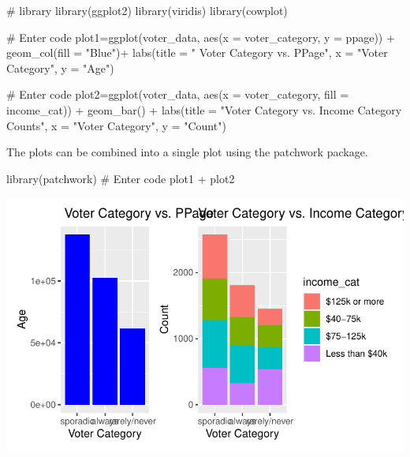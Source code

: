 \documentclass[
  letterpaper,
  DIV=11,
  numbers=noendperiod]{scrartcl}
\newenvironment{Shaded}{\begin{snugshade}}{\end{snugshade}}
\newcommand{\AttributeTok}[1]{\textcolor[rgb]{0.40,0.45,0.13}{#1}}
\newcommand{\CommentTok}[1]{\textcolor[rgb]{0.37,0.37,0.37}{#1}}
\newcommand{\FunctionTok}[1]{\textcolor[rgb]{0.28,0.35,0.67}{#1}}
\newcommand{\NormalTok}[1]{\textcolor[rgb]{0.00,0.23,0.31}{#1}}
\newcommand{\OtherTok}[1]{\textcolor[rgb]{0.00,0.23,0.31}{#1}}
\newcommand{\SpecialCharTok}[1]{\textcolor[rgb]{0.37,0.37,0.37}{#1}}
\newcommand{\StringTok}[1]{\textcolor[rgb]{0.13,0.47,0.30}{#1}}
\begin{document}
\begin{Shaded}
\begin{Highlighting}[]
\CommentTok{\# library}
\FunctionTok{library}\NormalTok{(ggplot2)}
\FunctionTok{library}\NormalTok{(viridis)}
\FunctionTok{library}\NormalTok{(cowplot)}

\CommentTok{\# Enter code}
\NormalTok{plot1}\OtherTok{=}\FunctionTok{ggplot}\NormalTok{(voter\_data, }\FunctionTok{aes}\NormalTok{(}\AttributeTok{x =}\NormalTok{ voter\_category, }\AttributeTok{y =}\NormalTok{ ppage)) }\SpecialCharTok{+}
  \FunctionTok{geom\_col}\NormalTok{(}\AttributeTok{fill =} \StringTok{"Blue"}\NormalTok{)}\SpecialCharTok{+}
  \FunctionTok{labs}\NormalTok{(}\AttributeTok{title =} \StringTok{" Voter Category vs. PPage"}\NormalTok{,}
       \AttributeTok{x =} \StringTok{"Voter Category"}\NormalTok{,}
       \AttributeTok{y =} \StringTok{"Age"}\NormalTok{)}
\end{Highlighting}
\end{Shaded}

\begin{Shaded}
\begin{Highlighting}[]
\CommentTok{\# Enter code}
\NormalTok{plot2}\OtherTok{=}\FunctionTok{ggplot}\NormalTok{(voter\_data, }\FunctionTok{aes}\NormalTok{(}\AttributeTok{x =}\NormalTok{ voter\_category, }\AttributeTok{fill =}\NormalTok{ income\_cat)) }\SpecialCharTok{+}
  \FunctionTok{geom\_bar}\NormalTok{() }\SpecialCharTok{+}
  \FunctionTok{labs}\NormalTok{(}\AttributeTok{title =} \StringTok{"Voter Category vs. Income Category Counts"}\NormalTok{,}
       \AttributeTok{x =} \StringTok{"Voter Category"}\NormalTok{,}
       \AttributeTok{y =} \StringTok{"Count"}\NormalTok{)}
\end{Highlighting}
\end{Shaded}

The plots can be combined into a single plot using the patchwork
package.

\begin{Shaded}
\begin{Highlighting}[]
\FunctionTok{library}\NormalTok{(patchwork)}
\CommentTok{\# Enter code}
\NormalTok{plot1 }\SpecialCharTok{+}\NormalTok{ plot2}
\end{Highlighting}
\end{Shaded}

\includegraphics{Lab4_multinom_Questions-1_files/figure-pdf/unnamed-chunk-8-1.pdf}
\end{document}
